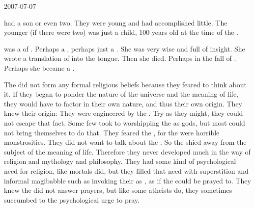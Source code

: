 2007-07-07

\Cishiel had a son or even two.
They were young and had accomplished little.
The younger (if there were two) was just a child, 100 years old at the time of the \firstbanewar.

\Essenai was a \resvil of \Kezerad.
Perhaps a \sathariah, perhaps just a \thelyad.
She was very wise and full of insight.
She wrote a translation of \WanderersInDarknessEmph into the \Resphan tongue.
Then she died.
Perhaps in the fall of \Kezerad.
Perhaps she became a \sephirah.

The \resphain did not form any formal religious beliefs because they feared to think about it.
If they began to ponder the nature of the universe and the meaning of life, they would have to factor in their own nature, and thus their own origin.
They knew their origin: They were engineered by the \banes.
Try as they might, they could not escape that fact.
Some few took to worshipping the \banes as gods, but most could not bring themselves to do that.
They feared the \banes, for the \banes were horrible monstrosities.
They did not want to talk about the \banes.
So the \resphain shied away from the subject of the meaning of life.
Therefore they never developed much in the way of religion and mythology and philosophy.
They had some kind of psychological need for religion, like mortals did, but they filled that need with superstition and informal magibabble such as invoking their \matrices as , as if the \matrices could be prayed to.
They knew the \matrices did not answer prayers, but like some atheists do, they sometimes succumbed to the psychological urge to pray.

